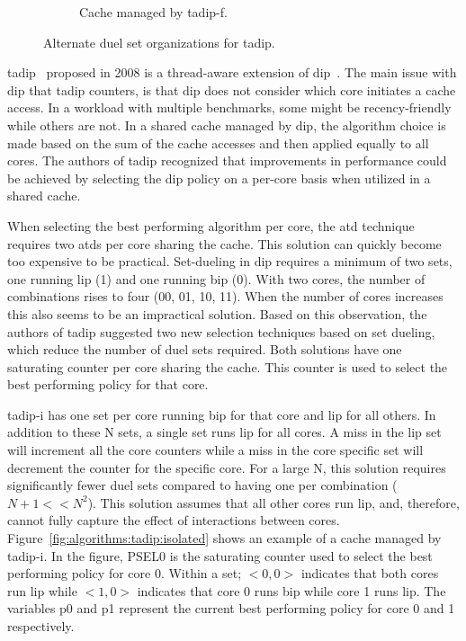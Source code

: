 \begin{figure}[H]
\begin{subfigure}[b]{0.45\textwidth}
        \caption{Cache managed by \gls{tadip-f}.}
        \label{fig:algorithms:tadip:feedback}
    \end{subfigure}    
    \caption{Alternate duel set organizations for \gls{tadip}.}
    \label{fig:algorithms:tadip}
\end{figure}

\gls{tadip}~\cite{Jaleel2008} proposed in 2008 is a thread-aware extension of \gls{dip}~\cite{Qureshi2007}.
The main issue with \gls{dip} that \gls{tadip} counters, is that \gls{dip} does not consider which core initiates a cache access.
In a workload with multiple benchmarks, some might be recency-friendly while others are not. 
In a shared cache managed by \gls{dip}, the algorithm choice is made based on the sum of the cache accesses and then applied equally to all cores.
The authors of \gls{tadip} recognized that improvements in performance could be achieved by selecting the \gls{dip} policy on a per-core basis when utilized in a shared cache.

When selecting the best performing algorithm per core, the \gls{atd} technique requires two \glspl{atd} per core sharing the cache. 
This solution can quickly become too expensive to be practical.
Set-dueling in \gls{dip} requires a minimum of two sets, one running \gls{lip} (1) and one running \gls{bip} (0). 
With two cores, the number of combinations rises to four (00, 01, 10, 11).
When the number of cores increases this also seems to be an impractical solution.
Based on this observation, the authors of \gls{tadip} suggested two new selection techniques based on set dueling, which reduce the number of duel sets required.
Both solutions have one saturating counter per core sharing the cache.
This counter is used to select the best performing policy for that core.

\gls{tadip-i} has one set per core running \gls{bip} for that core and \gls{lip} for all others.
In addition to these N sets, a single set runs \gls{lip} for all cores. 
A miss in the \gls{lip} set will increment all the core counters while a miss in the core specific set will decrement the counter for the specific core.
For a large N, this solution requires significantly fewer duel sets compared to having one per combination ($N+1 << N^2$). 
This solution assumes that all other cores run \gls{lip}, and, therefore, cannot fully capture the effect of interactions between cores.
Figure~\ref{fig:algorithms:tadip:isolated} shows an example of a cache managed by \gls{tadip-i}. 
In the figure, PSEL0 is the saturating counter used to select the best performing policy for core 0.
Within a set; $<0, 0>$ indicates that both cores run \gls{lip} while $<1, 0>$ indicates that core 0 runs \gls{bip} while core 1 runs \gls{lip}.
The variables p0 and p1 represent the current best performing policy for core 0 and 1 respectively.


